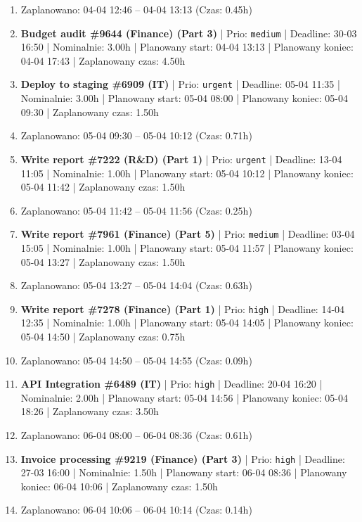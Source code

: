 {\begin{enumerate}
  \item [\textbf{PRZERWA}] Zaplanowano: 04-04 12:46 -- 04-04 13:13 (Czas: 0.45h)
  \item [\textbf{14659}] \textbf{Budget audit \#9644 (Finance) (Part 3)} | Prio: \texttt{medium} | Deadline: 30-03 16:50 | Nominalnie: 3.00h | Planowany start: 04-04 13:13 | Planowany koniec: 04-04 17:43 | Zaplanowany czas: 4.50h
  \item [\textbf{14597}] \textbf{Deploy to staging \#6909 (IT)} | Prio: \texttt{urgent} | Deadline: 05-04 11:35 | Nominalnie: 3.00h | Planowany start: 05-04 08:00 | Planowany koniec: 05-04 09:30 | Zaplanowany czas: 1.50h
  \item [\textbf{PRZERWA}] Zaplanowano: 05-04 09:30 -- 05-04 10:12 (Czas: 0.71h)
  \item [\textbf{14601}] \textbf{Write report \#7222 (R\&D) (Part 1)} | Prio: \texttt{urgent} | Deadline: 13-04 11:05 | Nominalnie: 1.00h | Planowany start: 05-04 10:12 | Planowany koniec: 05-04 11:42 | Zaplanowany czas: 1.50h
  \item [\textbf{PRZERWA}] Zaplanowano: 05-04 11:42 -- 05-04 11:56 (Czas: 0.25h)
  \item [\textbf{14657}] \textbf{Write report \#7961 (Finance) (Part 5)} | Prio: \texttt{medium} | Deadline: 03-04 15:05 | Nominalnie: 1.00h | Planowany start: 05-04 11:57 | Planowany koniec: 05-04 13:27 | Zaplanowany czas: 1.50h
  \item [\textbf{PRZERWA}] Zaplanowano: 05-04 13:27 -- 05-04 14:04 (Czas: 0.63h)
  \item [\textbf{14609}] \textbf{Write report \#7278 (Finance) (Part 1)} | Prio: \texttt{high} | Deadline: 14-04 12:35 | Nominalnie: 1.00h | Planowany start: 05-04 14:05 | Planowany koniec: 05-04 14:50 | Zaplanowany czas: 0.75h
  \item [\textbf{PRZERWA}] Zaplanowano: 05-04 14:50 -- 05-04 14:55 (Czas: 0.09h)
  \item [\textbf{14620}] \textbf{API Integration \#6489 (IT)} | Prio: \texttt{high} | Deadline: 20-04 16:20 | Nominalnie: 2.00h | Planowany start: 05-04 14:56 | Planowany koniec: 05-04 18:26 | Zaplanowany czas: 3.50h
  \item [\textbf{PRZERWA}] Zaplanowano: 06-04 08:00 -- 06-04 08:36 (Czas: 0.61h)
  \item [\textbf{14622}] \textbf{Invoice processing \#9219 (Finance) (Part 3)} | Prio: \texttt{high} | Deadline: 27-03 16:00 | Nominalnie: 1.50h | Planowany start: 06-04 08:36 | Planowany koniec: 06-04 10:06 | Zaplanowany czas: 1.50h
  \item [\textbf{PRZERWA}] Zaplanowano: 06-04 10:06 -- 06-04 10:14 (Czas: 0.14h)

\end{enumerate}}
